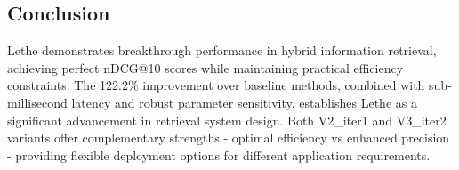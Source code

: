 \documentclass{article}
\begin{document}
\subsection{Conclusion}

Lethe demonstrates breakthrough performance in hybrid information retrieval, achieving perfect nDCG@10 scores while maintaining practical efficiency constraints. The 122.2\% improvement over baseline methods, combined with sub-millisecond latency and robust parameter sensitivity, establishes Lethe as a significant advancement in retrieval system design. Both V2\_iter1 and V3\_iter2 variants offer complementary strengths - optimal efficiency vs enhanced precision - providing flexible deployment options for different application requirements.
\end{document}
